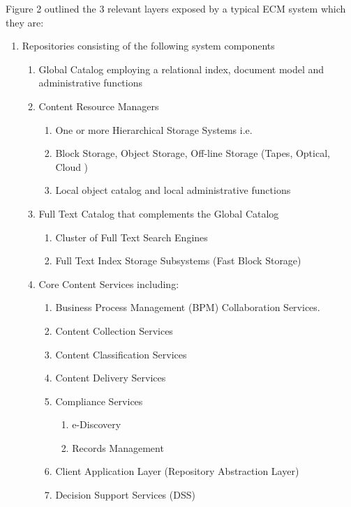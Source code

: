 Figure 2 outlined the 3 relevant layers exposed by a typical ECM system which they are:  
\begin{enumerate}
 \item Repositories consisting of the following system components 
\begin{enumerate}
 \item Global Catalog employing  a relational index, document model  and administrative functions
 \item Content Resource Managers
\begin{enumerate}
 \item One or more  Hierarchical Storage Systems i.e. 
 \item Block Storage, Object Storage, Off-line Storage (Tapes, Optical, Cloud ) 
 \item Local object catalog and local administrative functions 
\end{enumerate}
 \item Full Text Catalog that complements the Global Catalog 
\begin{enumerate}
 \item Cluster of Full Text Search Engines   
 \item Full Text Index Storage Subsystems (Fast Block Storage)
\end{enumerate}
\item Core Content Services including:
\begin{enumerate}
 \item Business Process Management (BPM) Collaboration Services.
 \item Content Collection Services
 \item Content Classification Services 
 \item Content Delivery Services 
 \item Compliance Services 
\begin{enumerate}
 \item e-Discovery 
 \item Records Management
\end{enumerate}
 \item Client Application Layer (Repository Abstraction Layer) 
 \item Decision Support Services  (DSS)
\end{enumerate}
\end{enumerate}
\end{enumerate}

